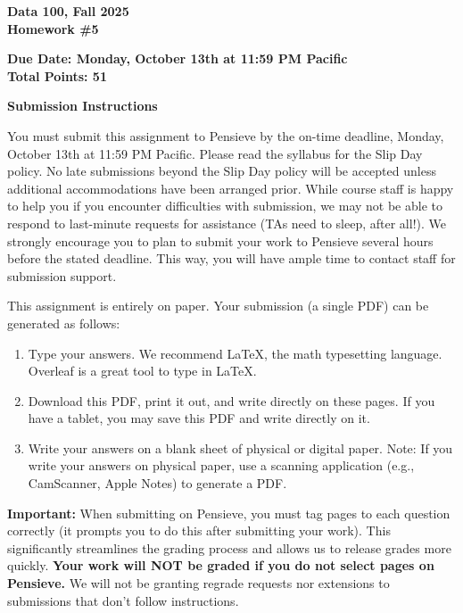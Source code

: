 \documentclass[11pt]{article}
\begin{document}
\begin{center}
    \vspace*{-1em}
    \textbf{\LARGE Data 100, Fall 2025}\\[4pt]
    \textbf{\LARGE Homework \#5}\\[4pt]
\end{center}

\noindent \textbf{Due Date: Monday, October 13th at 11:59 PM Pacific}\\
\textbf{Total Points: 51}

\bigskip

\noindent \textbf{Submission Instructions}

\medskip
You must submit this assignment to Pensieve by the on-time deadline, Monday, October 13th at 11:59 PM Pacific. Please read the syllabus for the Slip Day policy. No late submissions beyond the Slip Day policy will be accepted unless additional accommodations have been arranged prior. While course staff is happy to help you if you encounter difficulties with submission, we may not be able to respond to last-minute requests for assistance (TAs need to sleep, after all!). We strongly encourage you to plan to submit your work to Pensieve several hours before the stated deadline. This way, you will have ample time to contact staff for submission support.

\medskip
This assignment is entirely on paper. Your submission (a single PDF) can be generated as follows:
\begin{enumerate}[label=\arabic*.]
    \item Type your answers. We recommend \LaTeX, the math typesetting language. Overleaf is a great tool to type in \LaTeX.
    \item Download this PDF, print it out, and write directly on these pages. If you have a tablet, you may save this PDF and write directly on it.
    \item Write your answers on a blank sheet of physical or digital paper. Note: If you write your answers on physical paper, use a scanning application (e.g., CamScanner, Apple Notes) to generate a PDF.
\end{enumerate}

\bigskip

\newpage
\noindent \textbf{Important:} When submitting on Pensieve, you must tag pages to each question correctly (it prompts you to do this after submitting your work). This significantly streamlines the grading process and allows us to release grades more quickly. \textbf{Your work will NOT be graded if you do not select pages on Pensieve.} We will not be granting regrade requests nor extensions to submissions that don’t follow instructions.
\end{document}
